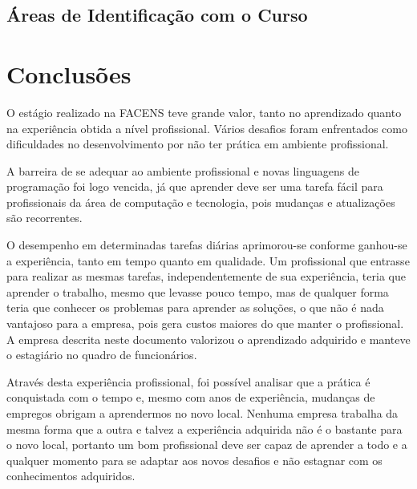 \documentclass[
	12pt,				%
	oneside,			%
	a4paper,			%
	chapter=TITLE,		%
	section=TITLE,		%
	sumario=tradicional %
	english,			%
	french,				%
	spanish,			%
	brazil				%
	]{abntex2}
\begin{document}
\section{Áreas de Identificação com o Curso}
\label{sec:identcurso}

\chapter{Conclusões}
\label{chap:chap6}
O estágio realizado na FACENS teve grande valor, tanto no aprendizado quanto na experiência obtida a nível profissional. Vários desafios foram enfrentados como dificuldades no desenvolvimento por não ter prática em ambiente profissional. 

A barreira de se adequar ao ambiente profissional e novas linguagens de programação foi logo vencida, já que aprender deve ser uma tarefa fácil para profissionais da área de computação e tecnologia, pois mudanças e atualizações são recorrentes.

O desempenho em determinadas tarefas diárias aprimorou-se conforme ganhou-se a experiência, tanto em tempo quanto em qualidade.  Um profissional que entrasse para realizar as mesmas tarefas, independentemente de sua experiência, teria que aprender o trabalho, mesmo que levasse pouco tempo, mas de qualquer forma teria que conhecer os problemas para aprender as soluções, o que não é nada vantajoso para a empresa, pois gera custos maiores do que manter o profissional. A empresa descrita neste documento valorizou o aprendizado adquirido e manteve o estagiário no quadro de funcionários.

Através desta experiência profissional, foi possível analisar que a prática é conquistada com o tempo e, mesmo com anos de experiência, mudanças de empregos obrigam a aprendermos no novo local. Nenhuma empresa trabalha da mesma forma que a outra e talvez a experiência adquirida não é o bastante para o novo local, portanto um bom profissional deve ser capaz de aprender a todo e a qualquer momento para se adaptar aos novos desafios e não estagnar com os conhecimentos adquiridos.


%

\postextual

%


\printindex
\end{document}

